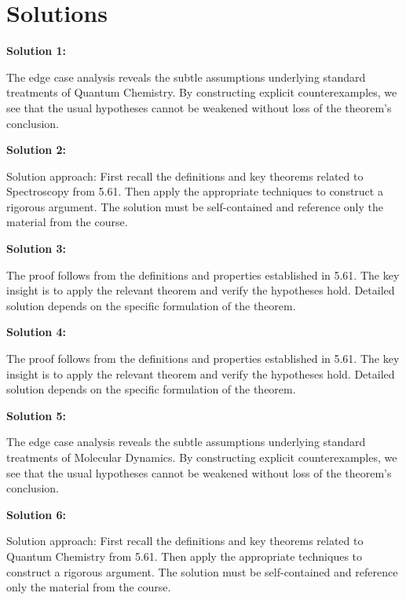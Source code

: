 \documentclass[12pt,a4paper]{exam}
\begin{document}
\newpage
\section*{Solutions}

\textbf{Solution 1:}

The edge case analysis reveals the subtle assumptions underlying standard treatments of Quantum Chemistry. By constructing explicit counterexamples, we see that the usual hypotheses cannot be weakened without loss of the theorem's conclusion.

\vspace{0.5cm}

\textbf{Solution 2:}

Solution approach: First recall the definitions and key theorems related to Spectroscopy from 5.61. Then apply the appropriate techniques to construct a rigorous argument. The solution must be self-contained and reference only the material from the course.

\vspace{0.5cm}

\textbf{Solution 3:}

The proof follows from the definitions and properties established in 5.61. The key insight is to apply the relevant theorem and verify the hypotheses hold. Detailed solution depends on the specific formulation of the theorem.

\vspace{0.5cm}

\textbf{Solution 4:}

The proof follows from the definitions and properties established in 5.61. The key insight is to apply the relevant theorem and verify the hypotheses hold. Detailed solution depends on the specific formulation of the theorem.

\vspace{0.5cm}

\textbf{Solution 5:}

The edge case analysis reveals the subtle assumptions underlying standard treatments of Molecular Dynamics. By constructing explicit counterexamples, we see that the usual hypotheses cannot be weakened without loss of the theorem's conclusion.

\vspace{0.5cm}

\textbf{Solution 6:}

Solution approach: First recall the definitions and key theorems related to Quantum Chemistry from 5.61. Then apply the appropriate techniques to construct a rigorous argument. The solution must be self-contained and reference only the material from the course.
\end{document}
